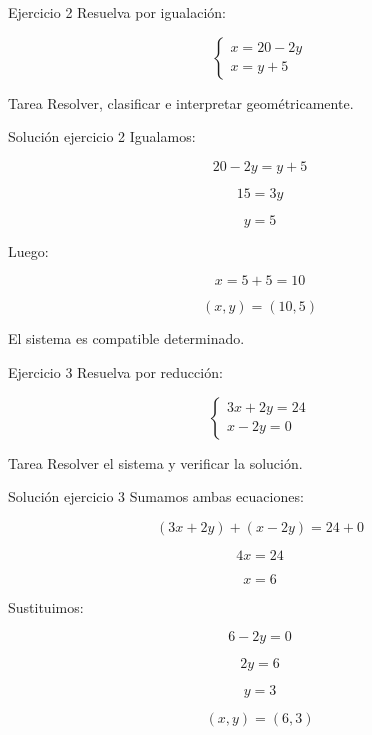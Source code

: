 \documentclass[aspectratio=169]{beamer}
\begin{document}
	\begin{frame}{Ejercicio 2}
		Resuelva por igualación:
		
		\[
		\begin{cases}
			x=20-2y\\
			x=y+5
		\end{cases}
		\]
		
		\bigskip
		
		\begin{block}{Tarea}
			Resolver, clasificar e interpretar geométricamente.
		\end{block}
	\end{frame}
	
	\begin{frame}{Solución ejercicio 2}
		Igualamos:
		
		\[
		20-2y=y+5
		\]
		
		\[
		15=3y
		\]
		
		\[
		y=5
		\]
		
		Luego:
		
		\[
		x=5+5=10
		\]
		
		\[
		\boxed{(x,y)=(10,5)}
		\]
		
		El sistema es compatible determinado.
	\end{frame}
	
	\begin{frame}{Ejercicio 3}
		Resuelva por reducción:
		
		\[
		\begin{cases}
			3x+2y=24\\
			x-2y=0
		\end{cases}
		\]
		
		\bigskip
		
		\begin{block}{Tarea}
			Resolver el sistema y verificar la solución.
		\end{block}
	\end{frame}
	
	\begin{frame}{Solución ejercicio 3}
		Sumamos ambas ecuaciones:
		
		\[
		(3x+2y)+(x-2y)=24+0
		\]
		
		\[
		4x=24
		\]
		
		\[
		x=6
		\]
		
		Sustituimos:
		
		\[
		6-2y=0
		\]
		
		\[
		2y=6
		\]
		
		\[
		y=3
		\]
		
		\[
		\boxed{(x,y)=(6,3)}
		\]
	\end{frame}
	
\end{document}
